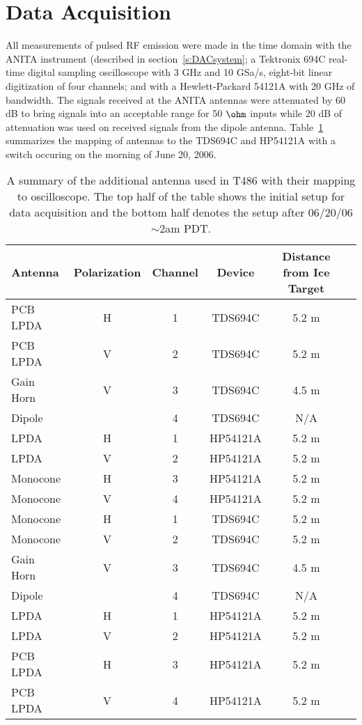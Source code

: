 \section{Data Acquisition}
\label{s:acq}
All measurements of pulsed RF emission were made in the time domain with the ANITA instrument (described in section~\ref{s:DACsystem}; a Tektronix 694C real-time digital sampling oscilloscope with 3 GHz and 10 GSa/s, eight-bit linear digitization of four channels; and with a Hewlett-Packard 54121A with 20 GHz of bandwidth.  The signals received at the ANITA antennas were attenuated by 60 dB to bring signals into an acceptable range for 50 $\ohm$ inputs while 20 dB of attenuation was used on received signals from the dipole antenna.  Table~\ref{tab:extAntenna} summarizes the mapping of antennas to the TDS694C and HP54121A with a switch occuring on the morning of June 20, 2006.

\begin{center}
\begin{table}
\caption{A summary of the additional antenna used in T486 with their mapping to oscilloscope.  The top half of the table shows the initial setup for data acquisition and the bottom half denotes the setup after 06/20/06 $\sim$2am PDT.}
\begin{tabular}{| l | c | c | c | c | c |} \hline
Antenna & Polarization & Channel & Device & Distance from Ice Target \\
\hline \hline
PCB LPDA & H & 1 & TDS694C & 5.2 m \\
PCB LPDA & V & 2 & TDS694C & 5.2 m \\
Gain Horn & V & 3 & TDS694C & 4.5 m\\
Dipole & & 4 & TDS694C & N/A \\
LPDA & H & 1 & HP54121A & 5.2 m \\
LPDA & V & 2 & HP54121A & 5.2 m \\
Monocone & H & 3 & HP54121A & 5.2 m \\
Monocone & V & 4 & HP54121A & 5.2 m \\
\hline
Monocone & H & 1 & TDS694C & 5.2 m \\
Monocone & V & 2 & TDS694C & 5.2 m \\
Gain Horn & V & 3 & TDS694C & 4.5 m\\
Dipole & & 4 & TDS694C & N/A \\
LPDA & H & 1 & HP54121A & 5.2 m \\
LPDA & V & 2 & HP54121A & 5.2 m \\
PCB LPDA & H & 3 & HP54121A & 5.2 m \\
PCB LPDA & V & 4 & HP54121A & 5.2 m \\
\hline
\end{tabular}
\label{tab:extAntenna}
\end{table}
\end{center}

